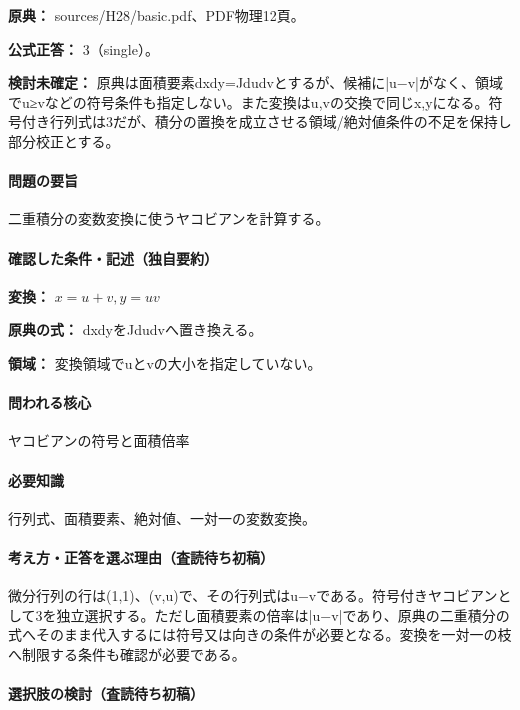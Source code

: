 \noindent\textbf{原典：} sources/H28/basic.pdf、PDF物理12頁。

\textbf{公式正答：} 3（single）。

\par\textbf{検討未確定：} 原典は面積要素dxdy=\allowbreak{}Jdudvとするが、候補に|u−v|がなく、領域でu≥vなどの符号条件も指定しない。また変換はu,vの交換で同じx,yになる。符号付き行列式は3だが、積分の置換を成立させる領域/絶対値条件の不足を保持し部分校正とする。

\paragraph{問題の要旨} 二重積分の変数変換に使うヤコビアンを計算する。

\paragraph{確認した条件・記述（独自要約）}\mbox{}\par

\noindent\textbf{変換：} \(x=u+v,y=uv\)\par

\noindent\textbf{原典の式：} dxdyをJdudvへ置き換える。\par

\noindent\textbf{領域：} 変換領域でuとvの大小を指定していない。\par

\paragraph{問われる核心} ヤコビアンの符号と面積倍率

\paragraph{必要知識} 行列式、面積要素、絶対値、一対一の変数変換。

\paragraph{考え方・正答を選ぶ理由（査読待ち初稿）} 微分行列の行は(1,1)、(v,u)で、その行列式はu−vである。符号付きヤコビアンとして3を独立選択する。ただし面積要素の倍率は|u−v|であり、原典の二重積分の式へそのまま代入するには符号又は向きの条件が必要となる。変換を一対一の枝へ制限する条件も確認が必要である。

\paragraph{選択肢の検討（査読待ち初稿）}\mbox{}\par

